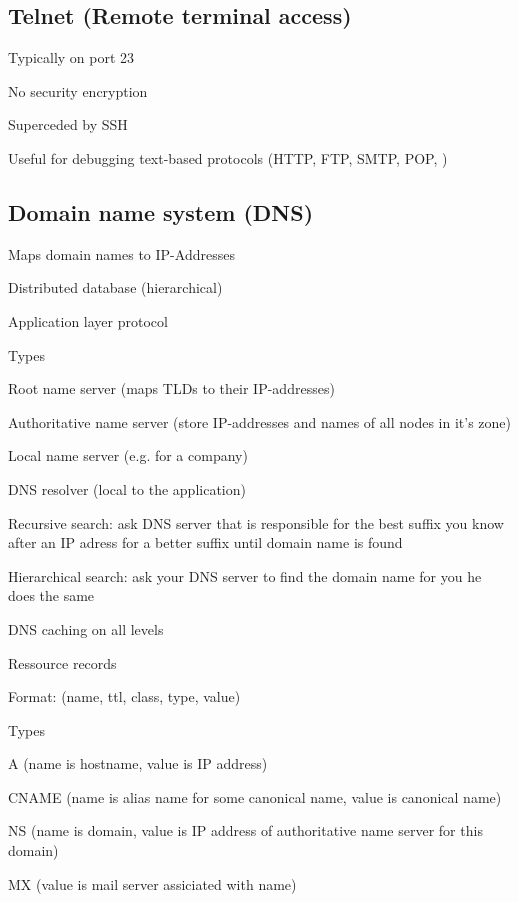 \subsection{Telnet (Remote terminal access)}
\enumstart
	\item Typically on port 23
	\item No security encryption
	\item Superceded by SSH
	\item Useful for debugging text-based protocols (HTTP, FTP, SMTP, POP, \ddd)
\enumend

\subsection{Domain name system (DNS)}
\enumstart
	\item Maps domain names to IP-Addresses
	\item Distributed database (hierarchical)
	\item Application layer protocol
	\item Types
	\enumstart
		\item Root name server (maps TLDs to their IP-addresses)
		\item Authoritative name server (store IP-addresses and names of all nodes in it's zone)
		\item Local name server (e.g. for a company)
		\item DNS resolver (local to the application)
	\enumend
	\item Recursive search: ask DNS server that is responsible for the best suffix you know after an IP adress for a better suffix \arrow until domain name is found
	\item Hierarchical search: ask your DNS server to find the domain name for you \arrow he does the same
	\item DNS caching \arrow on all levels
	\item Ressource records
	\enumstart
		\item Format: (name, ttl, class, type, value)
		\item Types
		\enumstart
			\item A (name is hostname, value is IP address)
			\item CNAME (name is alias name for some canonical name, value is canonical name)
			\item NS (name is domain, value is IP address of authoritative name server for this domain)
			\item MX (value is mail server assiciated with name)
